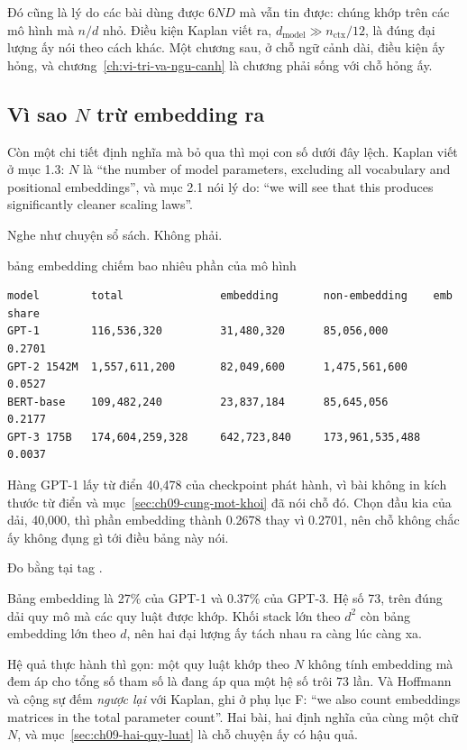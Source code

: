 Đó cũng là lý do các bài  dùng được \(6ND\) mà
vẫn tin được:
chúng khớp trên các mô hình mà \(n/d\) nhỏ. Điều kiện Kaplan viết ra,
\(d_{\mathrm{model}} \gg n_{\mathrm{ctx}}/12\), là đúng đại lượng ấy nói theo
cách khác. Một chương sau, ở chỗ ngữ cảnh dài, điều kiện ấy hỏng, và
chương~\ref{ch:vi-tri-va-ngu-canh} là chương phải sống với chỗ hỏng ấy.

\subsection*{Vì sao \texorpdfstring{\(N\)}{N} trừ embedding ra}

%
Còn một chi tiết định nghĩa mà bỏ qua thì mọi con số dưới đây lệch. Kaplan viết
ở mục 1.3: \(N\) là \enquote{the number of model parameters, excluding all
vocabulary and positional embeddings}, và mục 2.1 nói lý do:
\enquote{we will see that this produces significantly cleaner scaling laws}.

Nghe như chuyện sổ sách. Không phải.

\begin{measured}{bảng embedding chiếm bao nhiêu phần của mô hình}
\begin{verbatim}
model        total               embedding       non-embedding    emb share
GPT-1        116,536,320         31,480,320      85,056,000       0.2701
GPT-2 1542M  1,557,611,200       82,049,600      1,475,561,600    0.0527
BERT-base    109,482,240         23,837,184      85,645,056       0.2177
GPT-3 175B   174,604,259,328     642,723,840     173,961,535,488  0.0037
\end{verbatim}

Hàng GPT-1 lấy từ điển 40,478 của checkpoint phát hành, vì bài không in kích
thước từ điển và mục~\ref{sec:ch09-cung-mot-khoi} đã nói chỗ đó. Chọn đầu kia
của dải, 40,000, thì phần embedding thành 0.2678 thay vì 0.2701, nên chỗ không
chắc ấy không đụng gì tới điều bảng này nói.

Đo bằng  tại tag .
\end{measured}

Bảng embedding là 27\% của GPT-1 và 0.37\% của GPT-3. Hệ số 73, trên đúng dải
quy mô mà các quy luật được khớp. Khối stack lớn theo \(d^2\) còn bảng embedding
lớn theo \(d\), nên hai đại lượng ấy tách nhau ra càng lúc càng xa.

Hệ quả thực hành thì gọn: một quy luật khớp theo \(N\) không tính embedding mà
đem áp cho tổng số tham số là đang áp qua một hệ số trôi 73 lần. Và
Hoffmann và cộng sự đếm \emph{ngược lại} với Kaplan, ghi ở phụ lục F:
\enquote{we also count embeddings matrices in the total parameter count}. Hai
bài, hai định nghĩa của cùng một chữ \(N\), và
mục~\ref{sec:ch09-hai-quy-luat} là chỗ chuyện ấy có hậu quả.
